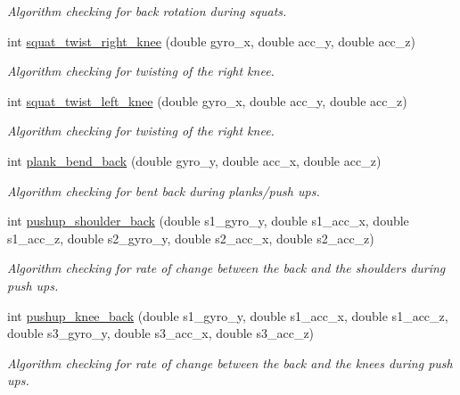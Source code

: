 \begin{DoxyCompactItemize}
\begin{DoxyCompactList}\small\item\em Algorithm checking for back rotation during squats. \end{DoxyCompactList}\item 
int \mbox{\hyperlink{class_integration__algorithms_a536f64355f0ccce1e191aebeee30a6d0}{squat\+\_\+twist\+\_\+right\+\_\+knee}} (double gyro\+\_\+x, double acc\+\_\+y, double acc\+\_\+z)
\begin{DoxyCompactList}\small\item\em Algorithm checking for twisting of the right knee. \end{DoxyCompactList}\item 
int \mbox{\hyperlink{class_integration__algorithms_aa53617d2e831625774f19c186f73ed01}{squat\+\_\+twist\+\_\+left\+\_\+knee}} (double gyro\+\_\+x, double acc\+\_\+y, double acc\+\_\+z)
\begin{DoxyCompactList}\small\item\em Algorithm checking for twisting of the right knee. \end{DoxyCompactList}\item 
int \mbox{\hyperlink{class_integration__algorithms_a19e62aed96ce9fd9c784e39924cc6617}{plank\+\_\+bend\+\_\+back}} (double gyro\+\_\+y, double acc\+\_\+x, double acc\+\_\+z)
\begin{DoxyCompactList}\small\item\em Algorithm checking for bent back during planks/push ups. \end{DoxyCompactList}\item 
int \mbox{\hyperlink{class_integration__algorithms_a4e11a75d0b52af4a46d1f18a6e6693f3}{pushup\+\_\+shoulder\+\_\+back}} (double s1\+\_\+gyro\+\_\+y, double s1\+\_\+acc\+\_\+x, double s1\+\_\+acc\+\_\+z, double s2\+\_\+gyro\+\_\+y, double s2\+\_\+acc\+\_\+x, double s2\+\_\+acc\+\_\+z)
\begin{DoxyCompactList}\small\item\em Algorithm checking for rate of change between the back and the shoulders during push ups. \end{DoxyCompactList}\item 
int \mbox{\hyperlink{class_integration__algorithms_a859df296a5fb433f665796823db4b401}{pushup\+\_\+knee\+\_\+back}} (double s1\+\_\+gyro\+\_\+y, double s1\+\_\+acc\+\_\+x, double s1\+\_\+acc\+\_\+z, double s3\+\_\+gyro\+\_\+y, double s3\+\_\+acc\+\_\+x, double s3\+\_\+acc\+\_\+z)
\begin{DoxyCompactList}\small\item\em Algorithm checking for rate of change between the back and the knees during push ups. \end{DoxyCompactList}\end{DoxyCompactItemize}

